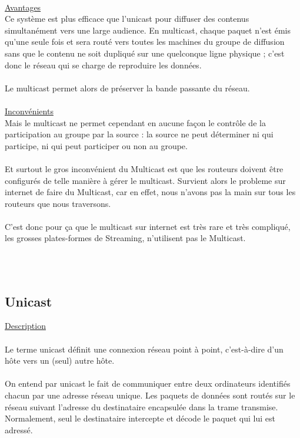 \documentclass{report}
\begin{document}
    \\
    \underline{Avantages}\\
   
   Ce système est plus efficace que l'unicast pour diffuser des contenus simultanément vers une large audience. En multicast, chaque paquet n'est émis qu'une seule fois et sera routé vers toutes les machines du groupe de diffusion sans que le contenu ne soit dupliqué sur une quelconque ligne physique ; c'est donc le réseau qui se charge de reproduire les données.
    \\
    \\
    Le multicast permet alors de préserver la bande passante du réseau. 
    \\
  
    \\    
    \underline{Inconvénients}\\
    
    Mais le multicast ne permet cependant en aucune façon le contrôle de la participation au groupe par la source : la source ne peut déterminer ni qui participe, ni qui peut participer ou non au groupe.
    \\
    \\
    Et surtout le gros inconvénient du Multicast est que les routeurs doivent être configurés de telle manière à gérer le multicast. Survient alors le probleme sur internet de faire du Multicast, car en effet, nous n’avons pas la main sur tous les routeurs que nous traversons.
    \\
    \\
    C’est donc pour ça que le multicast sur internet est très rare et très compliqué, les grosses plates-formes de Streaming, n’utilisent pas le Multicast.

    \\
   
    \\
        \subsection{Unicast}
   
     \underline{Description}
    \\
    
    \\
     Le terme unicast définit une connexion réseau point à point, c'est-à-dire d'un hôte vers un (seul) autre hôte.
    \\
    \\
    On entend par unicast le fait de communiquer entre deux ordinateurs identifiés chacun par une adresse réseau unique. Les paquets de données sont routés sur le réseau suivant l'adresse du destinataire encapsulée dans la trame transmise. Normalement, seul le destinataire intercepte et décode le paquet qui lui est adressé.
    \\
       \hfill{\\\\\\}
\end{document}
